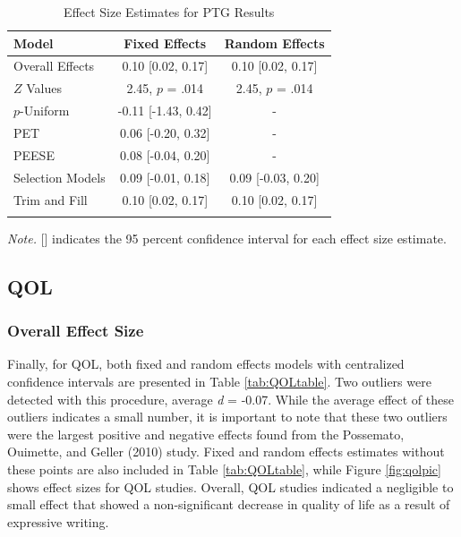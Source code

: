 \documentclass[english,man, mask]{apa6}
\theoremstyle{definition}
\theoremstyle{definition}
\theoremstyle{definition}
\theoremstyle{remark}
\begin{document}
\begin{table}[tbp]
\begin{center}
\begin{threeparttable}
\caption{\label{tab:PTGtable}Effect Size Estimates for PTG Results}
\small{
\begin{tabular}{lcc}
\toprule
Model & Fixed Effects & Random Effects\\
\midrule
Overall Effects & 0.10 [0.02, 0.17] & 0.10 [0.02, 0.17]\\
$Z$ Values & 2.45, $p$ = .014 & 2.45, $p$ = .014\\
$p$-Uniform & -0.11 [-1.43, 0.42] & -\\
PET & 0.06 [-0.20, 0.32] & -\\
PEESE & 0.08 [-0.04, 0.20] & -\\
Selection Models & 0.09 [-0.01, 0.18] & 0.09 [-0.03, 0.20]\\
Trim and Fill & 0.10 [0.02, 0.17] & 0.10 [0.02, 0.17]\\
\bottomrule
\addlinespace
\end{tabular}
}
\begin{tablenotes}[para]
\textit{Note.} [] indicates the 95 percent confidence interval for each effect size estimate.
\end{tablenotes}
\end{threeparttable}
\end{center}
\end{table}

\subsection{QOL}\label{qol}

\subsubsection{Overall Effect Size}\label{overall-effect-size-2}

Finally, for QOL, both fixed and random effects models with centralized
confidence intervals are presented in Table \ref{tab:QOLtable}. Two
outliers were detected with this procedure, average \emph{d} = -0.07.
While the average effect of these outliers indicates a small number, it
is important to note that these two outliers were the largest positive
and negative effects found from the Possemato, Ouimette, and Geller
(2010) study. Fixed and random effects estimates without these points
are also included in Table \ref{tab:QOLtable}, while Figure
\ref{fig:qolpic} shows effect sizes for QOL studies. Overall, QOL
studies indicated a negligible to small effect that showed a
non-significant decrease in quality of life as a result of expressive
writing.
\end{document}
